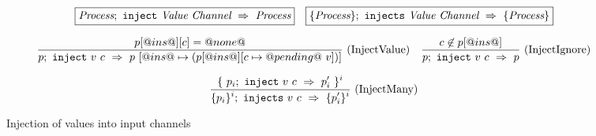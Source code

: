 
\begin{figure}

$$
\begin{array}{lr} 
  \boxed{\textit{Process};~\texttt{inject}~\textit{Value}~\textit{Channel}~\Rightarrow~\textit{Process}}
 & 
  \boxed{\{ \textit{Process} \};~\texttt{injects}~\textit{Value}~\textit{Channel}~\Rightarrow~\{ \textit{Process} \}}
 \end{array}
$$

$$
\ruleIN{
  p[@ins@][c] = @none@
}{
  \ProcInject{p}{v}{c}{p~[@ins@ \mapsto (p[@ins@][c \mapsto @pending@~v]) ] }
}{InjectValue}
%
\ruleIN{
  c \not\in p[@ins@]
}{
  \ProcInject{p}{v}{c}{p}
}{InjectIgnore}
$$

$$
\enskip \frac {\displaystyle 
  \{~ p_i;~\texttt{inject}~v~c~\Rightarrow~p'_i ~\}^i
} {\displaystyle 
  \{ p_i \}^i;~\texttt{injects}~v~c~\Rightarrow~\{ p'_i \}^i
} \  \mbox{(InjectMany)} \enskip
$$

\caption{Injection of values into input channels}
\label{fig:Process:Eval:Inject}
\end{figure}


